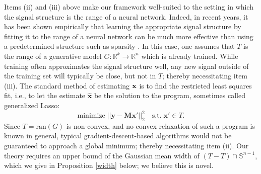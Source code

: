 \documentclass{article}
\def \x {\bf x}
\def \R {\mathbb{R}}
\def \xhat {\mathbf{\hat{x}}}
\begin{document}
\par
Items (ii) and (iii) above make our framework well-suited to the setting in which the signal structure is the range of a neural network.  Indeed, in recent years, it has been shown empirically that learning the appropriate signal structure by fitting it to the range of a neural network can be much more effective than using a predetermined structure such as sparsity \cite{bora2017compressed, van2018compressed, jalal2020robust}. In this case, one assumes that $T$ is the range of a generative model $G: \R^k \rightarrow \R^n$ which is already trained.  While training often approximates the signal structure well, any new signal outside of the training set will typically be close, but not in $T$; thereby necessitating item (iii).  The standard method of estimating $\x$ is to find the restricted least squares fit, i.e., to let the estimate $\xhat$ be the solution to the program, sometimes called generalized Lasso:
\begin{equation}\tag{P} \label{program}
    \mathrm{minimize} \; ||\mathbf{y} - \mathbf{M}\mathbf{x}'||_2^2 \quad \mathrm{s.t.} \; \mathbf{x}' \in T.
\end{equation}
Since $T = \mathrm{ran}(G)$ is non-convex, and no convex relaxation of such a program is known in general, typical gradient-descent-based algorithms would not be guaranteed to approach a global minimum; thereby necessitating item (ii). Our theory requires an upper bound of the Gaussian mean width of ${(T-T) \cap \mathbb{S}^{n-1}}$, which we give in Proposition \ref{width} below; we believe this is novel.


\end{document}
